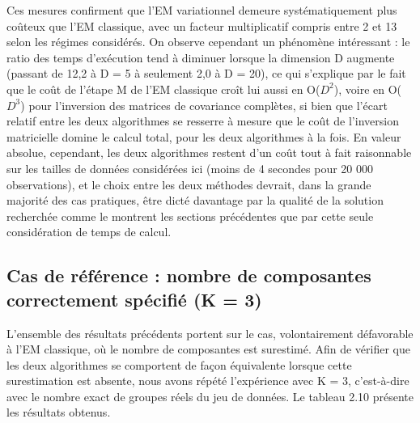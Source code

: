 Ces mesures confirment que l'EM variationnel demeure systématiquement plus coûteux que l'EM classique, avec un facteur multiplicatif compris entre 2 et 13 selon les régimes considérés. On observe cependant un phénomène intéressant : le ratio des temps d'exécution tend à diminuer lorsque la dimension D augmente (passant de 12,2 à D = 5 à seulement 2,0 à D = 20), ce qui s'explique par le fait que le coût de l'étape M de l'EM classique croît lui aussi en O($D^{2}$), voire en O($D^{3}$) pour l'inversion des matrices de covariance complètes, si bien que l'écart relatif entre les deux algorithmes se resserre à mesure que le coût de l'inversion matricielle domine le calcul total, pour les deux algorithmes à la fois. En valeur absolue, cependant, les deux algorithmes restent d'un coût tout à fait raisonnable sur les tailles de données considérées ici (moins de 4 secondes pour 20 000 observations), et le choix entre les deux méthodes devrait, dans la grande majorité des cas pratiques, être dicté davantage par la qualité de la solution recherchée  comme le montrent les sections précédentes  que par cette seule considération de temps de calcul.

\subsection{Cas de référence : nombre de composantes correctement spécifié (K = 3)}
L'ensemble des résultats précédents portent sur le cas, volontairement défavorable à l'EM classique, où le nombre de composantes est surestimé. Afin de vérifier que les deux algorithmes se comportent de façon équivalente lorsque cette surestimation est absente, nous avons répété l'expérience avec K = 3, c'est-à-dire avec le nombre exact de groupes réels du jeu de données. Le tableau 2.10 présente les résultats obtenus.


